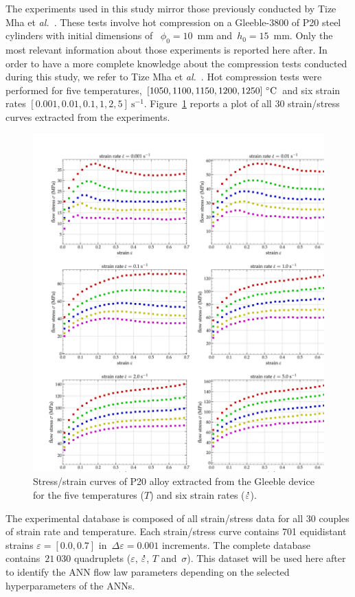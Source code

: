 \documentclass[algorithms,article,submit,pdftex,oneauthors]{Definitions/mdpi}
\makeatletter
\DeclareRobustCommand{\mdot}[1]{\accentset{\mbox{\bfseries .}}{#1}}
\DeclareRobustCommand{\eal}{et \emph{al.}\@\xspace}
\DeclareRobustCommand{\ps}{\text{s}^{-1}}
\makeatother
\begin{document}
\textcolor{greencolor}{The experiments used in this study mirror those previously conducted by Tize Mha \eal~\cite{Tize-2023-IEP}.
These tests involve hot compression on a Gleeble-3800 of P20 steel cylinders with initial dimensions of ~$\phi_{0}=10$~mm and~$h_{0}=15$~mm.}
Only the most relevant information about those experiments is reported here after.
In order to have a more complete knowledge about the compression tests conducted during this study, \textcolor{greencolor}{we} refer to Tize Mha \eal~\cite{Tize-2023-IEP}.
\textcolor{greencolor}{Hot compression tests were performed for five temperatures, $[1050,1100,1150,1200,1250]~\celsius$ and six strain rates $[0.001,0.01,0.1,1,2,5]~\ps$.
Figure~\ref{fig:RawData} reports a plot of all 30 strain/stress curves extracted from the experiments.}
\begin{figure}[h!]
\centering
\includegraphics[width=0.9\columnwidth]{Figures/3Cr2Mo-raw}
\caption{Stress/strain curves of P20 alloy extracted from the Gleeble device for the five temperatures ($T$) and six strain rates ($\mdot{\varepsilon}$).}
\label{fig:RawData}
\end{figure}
The experimental database is composed of all strain/stress data for all 30 couples of strain rate and temperature.
\textcolor{greencolor}{Each strain/stress curve contains 701 equidistant strains $\varepsilon=[0.0,0.7]$ in~$\Delta\varepsilon=0.001$ increments.
The complete database contains~$21~030$ quadruplets ($\varepsilon$, $\mdot{\varepsilon}$, $T$ and~$\sigma$).}
This dataset will be used here after to identify the ANN flow law parameters depending on the selected hyperparameters of the ANNs.
\end{document}
